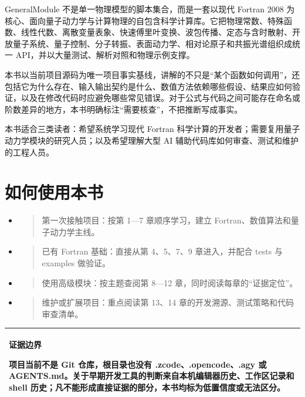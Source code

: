 \documentclass[UTF8,openany,11pt,fontset=fandol]{ctexbook}
\begin{document}
GeneralModule 不是单一物理模型的脚本集合，而是一套以现代 Fortran 2008
为核心、面向量子动力学与计算物理的自包含科学计算库。它把物理常数、特殊函数、线性代数、离散变量表象、快速傅里叶变换、波包传播、定态与含时散射、开放量子系统、量子控制、分子转振、表面动力学、相对论原子和共振光谱组织成统一
API，并以大量测试、解析对照和物理示例支撑。

本书以当前项目源码为唯一项目事实基线，讲解的不只是``某个函数如何调用''，还包括它为什么存在、输入输出契约是什么、数值方法依赖哪些假设、结果应如何验证，以及在修改代码时应避免哪些常见错误。对于公式与代码之间可能存在命名或阶数差异的地方，本书明确标注``需要核查''，不把推断写成事实。

本书适合三类读者：希望系统学习现代 Fortran
科学计算的开发者；需要复用量子动力学模块的研究人员；以及希望理解大型 AI
辅助代码库如何审查、测试和维护的工程人员。

\hypertarget{ux5982ux4f55ux4f7fux7528ux672cux4e66}{%
\section{\texorpdfstring{\textbf{如何使用本书}}{如何使用本书}}\label{ux5982ux4f55ux4f7fux7528ux672cux4e66}}

\begin{itemize}
\item
  \begin{quote}
  第一次接触项目：按第 1---7 章顺序学习，建立
  Fortran、数值算法和量子动力学主线。
  \end{quote}
\item
  \begin{quote}
  已有 Fortran 基础：直接从第 4、5、7、9 章进入，并配合 tests 与
  examples 做验证。
  \end{quote}
\item
  \begin{quote}
  使用高级模块：按主题查阅第 8---12 章，同时阅读每章的``证据定位''。
  \end{quote}
\item
  \begin{quote}
  维护或扩展项目：重点阅读第 13、14
  章的开发溯源、测试策略和代码审查清单。
  \end{quote}
\end{itemize}

\begin{longtable}[]{@{}l@{}}
\toprule
\endhead
\begin{minipage}[t]{0.97\columnwidth}\raggedright
\textbf{证据边界}

项目当前不是 Git 仓库，根目录也没有 .zcode、.opencode、.agy 或
AGENTS.md。关于早期开发工具的判断来自本机编辑器历史、工作区记录和 shell
历史；凡不能形成直接证据的部分，本书均标为低置信度或无法区分。\strut
\end{minipage}\tabularnewline
\bottomrule
\end{longtable}
\end{document}
